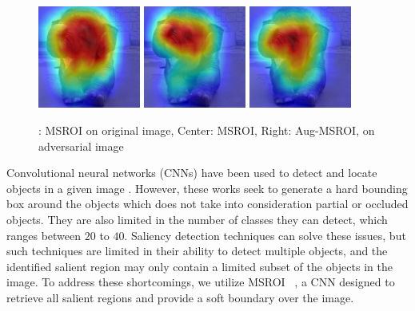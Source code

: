 \begin{figure}[H]
\centering
     \includegraphics[width=0.3\textwidth,angle=0,scale=0.7]{figures/protect/original_msroi.jpg}
     \includegraphics[width=0.3\textwidth,angle=0,scale=0.7]{figures/protect/adversarial_msroi.jpg}
     \includegraphics[width=0.3\textwidth,angle=0,scale=0.7]{figures/protect/MSROI_after.jpg}
     \label{fig:msroi}
          \caption{{\footnotesize : MSROI on original image, Center: MSROI, Right: Aug-MSROI, on adversarial image}}
 \end{figure}
 

Convolutional neural networks (CNNs) have been used to detect and locate objects in a given image \cite{Erhan2014ScalableOD,Zhao_2015_CVPR}. 
However, these works seek to generate a hard bounding box around the objects which does not take into consideration partial or occluded objects.
They are also limited in the number of classes they can detect, which ranges between $20$ to $40$.
Saliency detection techniques can solve these issues, but such techniques are limited in their ability to detect multiple objects, and the identified salient region may only contain a limited subset of the objects in the image.
To address these shortcomings, we utilize MSROI  ~\cite{Prakash2017SemanticPI}, a CNN designed to retrieve all salient regions and provide a soft boundary over the image.


